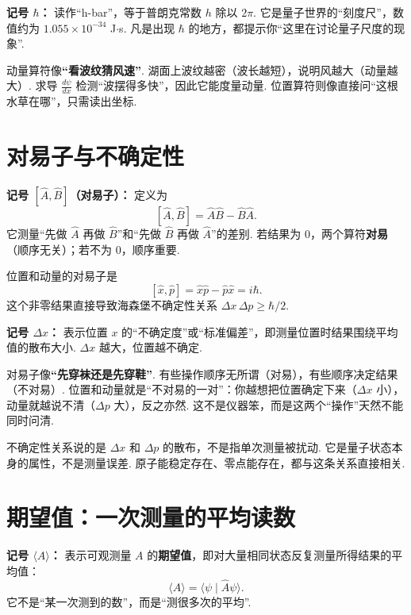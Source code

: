 \documentclass[UTF8,11pt,a4paper,openany]{ctexbook}
\newcommand{\braket}[2]{\langle #1\mid #2\rangle}\newcommand{\ii}{\mathrm i}
\newcommand{\term}[1]{\textbf{#1}}
\begin{document}
\begin{notationbox}
\textbf{记号 $\hbar$：} 读作“h-bar”，等于普朗克常数 $h$ 除以 $2\pi$. 它是量子世界的“刻度尺”，数值约为 $1.055\times10^{-34}$ J$\cdot$s. 凡是出现 $\hbar$ 的地方，都提示你“这里在讨论量子尺度的现象”. 
\end{notationbox}

\begin{analogybox}
动量算符像\textbf{“看波纹猜风速”}. 湖面上波纹越密（波长越短），说明风越大（动量越大）. 求导 $\frac{d\psi}{dx}$ 检测“波摆得多快”，因此它能度量动量. 位置算符则像直接问“这根水草在哪”，只需读出坐标. 
\end{analogybox}

\section{对易子与不确定性}
\textbf{记号 $[\hat A,\hat B]$（对易子）：} 定义为
\[
[\hat A,\hat B]=\hat A\hat B-\hat B\hat A.
\]
它测量“先做 $\hat A$ 再做 $\hat B$”和“先做 $\hat B$ 再做 $\hat A$”的差别. 若结果为 $0$，两个算符\term{对易}（顺序无关）；若不为 $0$，顺序重要. 

位置和动量的对易子是
\[
[\hat x,\hat p]=\hat x\hat p-\hat p\hat x=i\hbar.
\]
这个非零结果直接导致海森堡不确定性关系 $\Delta x\,\Delta p\ge\hbar/2$. 

\begin{notationbox}
\textbf{记号 $\Delta x$：} 表示位置 $x$ 的“不确定度”或“标准偏差”，即测量位置时结果围绕平均值的散布大小. $\Delta x$ 越大，位置越不确定. 
\end{notationbox}

\begin{analogybox}
对易子像\textbf{“先穿袜还是先穿鞋”}. 有些操作顺序无所谓（对易），有些顺序决定结果（不对易）. 位置和动量就是“不对易的一对”：你越想把位置确定下来（$\Delta x$ 小），动量就越说不清（$\Delta p$ 大），反之亦然. 这不是仪器笨，而是这两个“操作”天然不能同时问清. 
\end{analogybox}

\begin{limitbox}
不确定性关系说的是 $\Delta x$ 和 $\Delta p$ 的散布，不是指单次测量被扰动. 它是量子状态本身的属性，不是测量误差. 原子能稳定存在、零点能存在，都与这条关系直接相关. 
\end{limitbox}

\section{期望值：一次测量的平均读数}
\textbf{记号 $\langle A\rangle$：} 表示可观测量 $A$ 的\term{期望值}，即对大量相同状态反复测量所得结果的平均值：
\[
\langle A\rangle=\braket\psi{\hat A\psi}.
\]
它不是“某一次测到的数”，而是“测很多次的平均”. 
\end{document}
